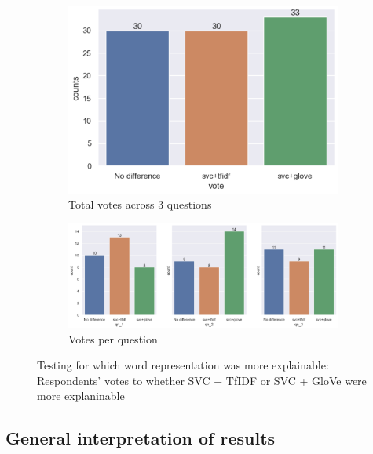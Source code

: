 \begin{figure}[!ht]
    \begin{subfigure}[b]{0.75\textwidth}
      \centering
      \includegraphics[width=1\linewidth]{figures/part5_votes.png}
      \caption{Total votes across 3 questions}
    \end{subfigure}
    \hfill
    \begin{subfigure}[b]{1\textwidth}
      \centering
      \includegraphics[width=1\linewidth]{figures/part_5_votes_1.png}
      \caption{Votes per question}
    \end{subfigure}
    \caption{Testing for which word representation was more explainable: Respondents' votes to whether SVC + TfIDF or SVC + GloVe were more explaninable}
    \label{fig:part5}
\end{figure}

\subsection{General interpretation of results}
